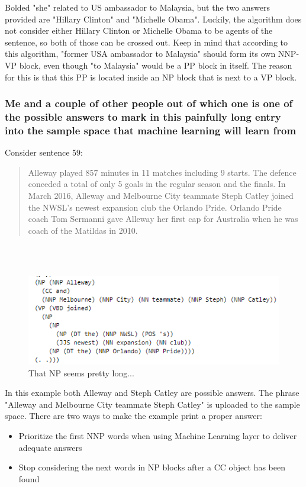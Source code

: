 \documentclass{article}
\begin{document}
Bolded "she" related to US ambassador to Malaysia, but the two answers provided are "Hillary Clinton" and "Michelle Obama". Luckily, the algorithm does not consider either Hillary Clinton or Michelle Obama to be agents of the sentence, so both of those can be crossed out. Keep in mind that according to this algorithm, "former USA ambassador to Malaysia" should form its own NNP-VP block, even though "to Malaysia" would be a PP block in itself. The reason for this is that this PP is located inside an NP block that is next to a VP block.

\subsubsection{Me and a couple of other people out of which one is one of the possible answers to mark in this painfully long entry into the sample space that machine learning will learn from}
Consider sentence 59:
\begin{quote}
    Alleway played 857 minutes in 11 matches including 9 starts. The defence conceded a total of only 5 goals in the regular season and the finals. In March 2016, Alleway and Melbourne City teammate Steph Catley joined the NWSL's newest expansion club the Orlando Pride. Orlando Pride coach Tom Sermanni gave Alleway her first cap for Australia when he was coach of the Matildas in 2010.
\end{quote} \\ \\
\begin{figure}[h!]
    \centering
\includegraphics[]{Example9.png}
    \caption{That NP seems pretty long...}
\end{figure}
In this example both Alleway and Steph Catley are possible answers. The phrase "Alleway and Melbourne City teammate Steph Catley" is uploaded to the sample space. There are two ways to make the example print a proper answer:
\begin{itemize}
    \item Prioritize the first NNP words when using Machine Learning layer to deliver adequate answers
    \item Stop considering the next words in NP blocks after a CC object has been found
\end{itemize}
\end{document}
